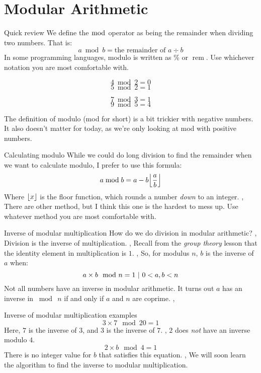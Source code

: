 \section{Modular Arithmetic}
\begin{namedframe}{Quick review}
	We define the \alert{$\bmod$} operator as being the remainder when dividing two numbers.
	That is:
	\[a \bmod b = \text{the remainder of } a \div b\]
	In some programming languages, modulo is written as \alert{$\%$} or \alert{$\operatorname{rem}$}.
	Use whichever notation you are most comfortable with.
	\begin{examples}
		\centering
		\begin{minipage}{0.45\textwidth}
			\[4 \bmod 2 = 0\]
			\[5 \bmod 2 = 1\]
		\end{minipage}
		\begin{minipage}{0.45\textwidth}
			\[7 \bmod 3 = 1\]
			\[9 \bmod 5 = 4\]
		\end{minipage}
	\end{examples}
	\footnotesize
	The definition of modulo (mod for short) is a bit trickier with negative numbers.
	It also doesn't matter for today, as we're only looking at mod with positive numbers.
\end{namedframe}
\begin{namedframe}{Calculating modulo}
	While we could do long division to find the remainder when we want to calculate modulo, I prefer to use this formula:
	\[a \bmod b = a - b \floor*{\frac{a}{b}}\]
	Where $\lfloor x\rfloor$ is the floor function, which rounds a number \emph{down} to an integer.
	\sep
	There are other method, but I think this one is the hardest to mess up.
	Use whatever method you are most comfortable with.
\end{namedframe}
\begin{namedframe}{Inverse of modular multiplication}
	How do we do division in modular arithmetic?
	\sep
	Division is the inverse of multiplication.
	\sep
	Recall from the \emph{group theory} lesson that the identity element in multiplication is $1$.
	\sep
	So, for modulus $n$, $b$ is the inverse of $a$ when:
	\[a \times b \mod n = 1 \ |\  0 < a, b < n\]
	\pause
	Not all numbers have an inverse in modular arithmetic.
	\vertspace
	It turns out $a$ has an inverse in $\bmod\ n$ if and only if $a$ and $n$ are coprime.
	\sep
\end{namedframe}
\begin{namedframe}{Inverse of modular multiplication examples}
	\[3 \times 7 \mod 20 = 1\]
	Here, $7$ is the inverse of $3$, and $3$ is the inverse of $7$.
	\sep
	$2$ does \emph{not} have an inverse modulo $4$.
	\[2 \times b \mod 4 = 1\]
	There is no integer value for $b$ that satisfies this equation.
	\sep
	We will soon learn the algorithm to find the inverse to modular multiplication.
\end{namedframe}
